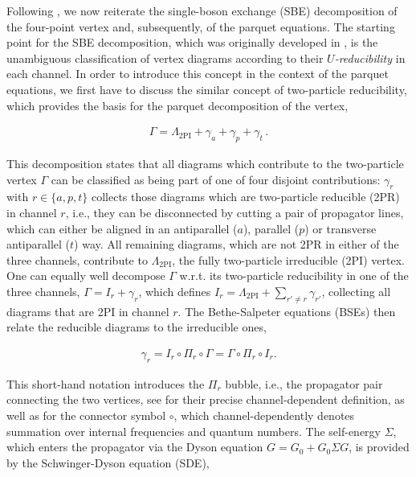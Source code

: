 \documentclass{SciPost}
\begin{document}
Following \cite{gievers_multiloop_2022}, we now reiterate the single-boson exchange (SBE) decomposition of the four-point vertex and, subsequently, of the parquet equations. The starting point for the SBE decomposition, which was originally developed in \cite{PhysRevB.99.235106, PhysRevB.100.155149, PhysRevB.100.245147, PhysRevB.102.235133, PhysRevB.102.195131, PhysRevResearch.3.013149}, is the unambiguous classification of vertex diagrams according to their \textsl{$U$-reducibility} in each channel. In order to introduce this concept in the context of the parquet equations, we first have to discuss the similar concept of two-particle reducibility, which provides the basis for the parquet decomposition of the vertex,
%
\begin{linenomath}
    \begin{align}
        \Gamma = \Lambda_{\text{2PI}} + \gamma_a + \gamma_p + \gamma_t
        \label{eq:parquet-decomp} \,.
    \end{align}
\end{linenomath}
%
This decomposition states that all diagrams which contribute to the two-particle vertex $\Gamma$ can be classified as being part of one of four disjoint contributions: $\gamma_r$ with $r\in \{a,p,t\}$ collects those diagrams which are two-particle reducible (2PR) in channel $r$, i.e., they can be disconnected by cutting a pair of propagator lines, which can either be aligned in an antiparallel ($a$), parallel ($p$) or transverse antiparallel ($t$) way. All remaining diagrams, which are not 2PR in either of the three channels, contribute to $\Lambda_{\text{2PI}}$, the fully two-particle irreducible (2PI) vertex. One can equally well decompose $\Gamma$ w.r.t. its two-particle reducibility in one of the three channels, $\Gamma = I_r + \gamma_r$, which defines $I_r = \Lambda_{\text{2PI}} + \sum_{r'\neq r} \gamma_{r'}$, collecting all diagrams that are 2PI in channel $r$. The Bethe-Salpeter equations (BSEs) then relate the reducible diagrams to the irreducible ones,
%
\begin{linenomath}
    \begin{align}
    \gamma_r = I_r \circ \Pi_r \circ \Gamma = \Gamma \circ \Pi_r \circ I_r.
    \label{eq:Bethe-Salpeter-equations}
    \end{align}
\end{linenomath}
%
This short-hand notation introduces the $\Pi_r$ bubble, i.e., the propagator pair connecting the two vertices, see \cite{gievers_multiloop_2022} for their precise channel-dependent definition, as well as for the connector symbol $\circ$, which channel-dependently denotes summation over internal frequencies and quantum numbers. The self-energy $\Sigma$, which enters the propagator via the Dyson equation $G=G_0+G_0\Sigma G$, is provided by the Schwinger-Dyson equation (SDE),
\end{document}
